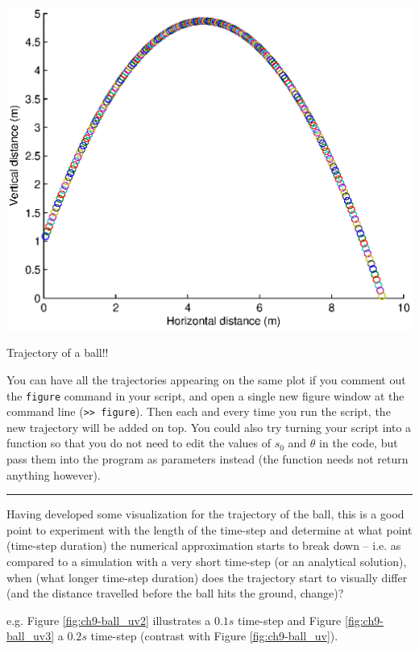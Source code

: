 \documentclass{tufte-book} %
\begin{document}
\begin{marginfigure}[-0.0in]
\includegraphics[width=\linewidth]{ch9-ball_uv.eps}
\caption{Trajectory of a ball!!}
\label{fig:ch9-ball_uv}
\end{marginfigure}

You can have all the trajectories appearing on the same plot if you comment out the \texttt{figure} command in your script, and open a single new figure window at the command line (\texttt{>> figure}). Then each and every time you run the script, the new trajectory will be added on top. You could also try turning your script into a function so that you do not need to edit the values of \(s_{0}\) and \(\theta\) in the code, but pass them into the program as parameters instead (the function needs not return anything however). 

\vspace{1mm}
\noindent\rule{4cm}{0.5pt}
\vspace{2mm}

\noindent Having developed some visualization for the trajectory of the ball, this is a good point to experiment with the length of the time-step and determine at what point (time-step duration) the numerical approximation starts to break down -- i.e. as compared to a simulation with a very short time-step (or an analytical solution), when (what longer time-step duration) does the trajectory start to visually differ (and the distance travelled before the ball hits the ground, change)?

e.g. Figure \ref{fig:ch9-ball_uv2} illustrates a \(0.1s\) time-step and Figure \ref{fig:ch9-ball_uv3} a \(0.2s\) time-step (contrast with Figure \ref{fig:ch9-ball_uv}).
\end{document}
